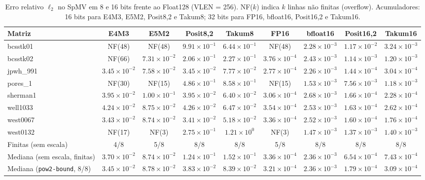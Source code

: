 \begin{table}[t]
\caption{Erro relativo $\ell_2$ no SpMV em 8 e 16 bits frente ao Float128 (VLEN = 256). NF($k$) indica $k$ linhas n\~ao finitas (overflow). Acumuladores: 16 bits para E4M3, E5M2, Posit8,2 e Takum8; 32 bits para FP16, bfloat16, Posit16,2 e Takum16.}
\label{tab:precisao816}
\centering
\scriptsize
\setlength{\tabcolsep}{3.2pt}
\renewcommand{\arraystretch}{0.96}
\begin{tabular}{@{}lcccccccc@{}}
\toprule
Matriz & E4M3 & E5M2 & Posit8,2 & Takum8 & FP16 & bfloat16 & Posit16,2 & Takum16 \\
\midrule
bcsstk01 & NF(48) & NF(48) & $9.91 \times 10^{-1}$ & $6.44 \times 10^{-1}$ & NF(48) & $2.28 \times 10^{-3}$ & $1.17 \times 10^{-2}$ & $3.24 \times 10^{-3}$ \\
bcsstk02 & NF(66) & $7.31 \times 10^{-2}$ & $2.06 \times 10^{-1}$ & $2.27 \times 10^{-1}$ & $3.76 \times 10^{-4}$ & $2.43 \times 10^{-3}$ & $1.14 \times 10^{-3}$ & $1.20 \times 10^{-3}$ \\
jpwh\_991 & $3.45 \times 10^{-2}$ & $7.58 \times 10^{-2}$ & $3.45 \times 10^{-2}$ & $7.77 \times 10^{-2}$ & $2.77 \times 10^{-4}$ & $2.26 \times 10^{-3}$ & $1.44 \times 10^{-4}$ & $3.04 \times 10^{-4}$ \\
pores\_1 & NF(30) & NF(15) & $4.86 \times 10^{-1}$ & $8.58 \times 10^{-1}$ & NF(15) & $1.53 \times 10^{-3}$ & $7.56 \times 10^{-3}$ & $1.18 \times 10^{-3}$ \\
sherman1 & $3.95 \times 10^{-2}$ & $1.00 \times 10^{-1}$ & $3.95 \times 10^{-2}$ & $6.40 \times 10^{-2}$ & $3.06 \times 10^{-4}$ & $2.68 \times 10^{-3}$ & $1.66 \times 10^{-4}$ & $2.28 \times 10^{-4}$ \\
well1033 & $4.24 \times 10^{-2}$ & $8.75 \times 10^{-2}$ & $4.26 \times 10^{-2}$ & $6.47 \times 10^{-2}$ & $3.54 \times 10^{-4}$ & $2.53 \times 10^{-3}$ & $1.63 \times 10^{-4}$ & $2.62 \times 10^{-4}$ \\
west0067 & $3.43 \times 10^{-2}$ & $8.74 \times 10^{-2}$ & $3.41 \times 10^{-2}$ & $5.18 \times 10^{-2}$ & $3.36 \times 10^{-4}$ & $2.52 \times 10^{-3}$ & $1.60 \times 10^{-4}$ & $1.76 \times 10^{-4}$ \\
west0132 & NF(17) & NF(3) & $2.75 \times 10^{-1}$ & $1.21 \times 10^{0}$ & NF(3) & $1.47 \times 10^{-3}$ & $1.37 \times 10^{-3}$ & $1.40 \times 10^{-3}$ \\
\midrule
Finitas (sem escala) & 4/8 & 5/8 & 8/8 & 8/8 & 5/8 & 8/8 & 8/8 & 8/8 \\
Mediana (sem escala, finitas) & $3.70 \times 10^{-2}$ & $8.74 \times 10^{-2}$ & $1.24 \times 10^{-1}$ & $1.52 \times 10^{-1}$ & $3.36 \times 10^{-4}$ & $2.36 \times 10^{-3}$ & $6.54 \times 10^{-4}$ & $7.43 \times 10^{-4}$ \\
Mediana (\texttt{pow2-bound}, 8/8) & $3.45 \times 10^{-2}$ & $8.78 \times 10^{-2}$ & $3.83 \times 10^{-2}$ & $8.39 \times 10^{-2}$ & $3.21 \times 10^{-4}$ & $2.36 \times 10^{-3}$ & $1.79 \times 10^{-4}$ & $3.09 \times 10^{-4}$ \\
\bottomrule
\end{tabular}
\end{table}
